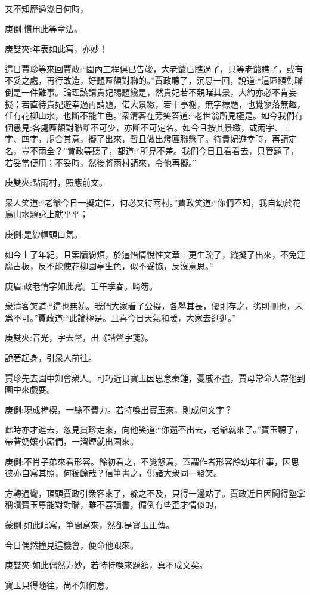 \begin{parag}
    又不知歷過幾日何時，\begin{note}庚側:慣用此等章法。\end{note}\begin{note}庚雙夾:年表如此寫，亦妙！\end{note}這日賈珍等來回賈政:“園內工程俱已告竣，大老爺已瞧過了，只等老爺瞧了，或有不妥之處，再行改造，好題匾額對聯的。”賈政聽了，沉思一回，說道:“這匾額對聯倒是一件難事。論理該請貴妃賜題纔是，然貴妃若不親睹其景，大約亦必不肯妄擬；若直待貴妃遊幸過再請題，偌大景緻，若干亭榭，無字標題，也覺寥落無趣，任有花柳山水，也斷不能生色。”衆清客在旁笑答道:“老世翁所見極是。如今我們有個愚見:各處匾額對聯斷不可少，亦斷不可定名。如今且按其景緻，或兩字、三字、四字，虛合其意，擬了出來，暫且做出燈匾聯懸了。待貴妃遊幸時，再請定名，豈不兩全？”賈政等聽了，都道:“所見不差。我們今日且看看去，只管題了，若妥當便用；不妥時，然後將雨村請來，令他再擬。”\begin{note}庚雙夾:點雨村，照應前文。\end{note}衆人笑道:“老爺今日一擬定佳，何必又待雨村。”賈政笑道:“你們不知，我自幼於花鳥山水題詠上就平平；\begin{note}庚側:是紗帽頭口氣。\end{note}如今上了年紀，且案牘紛煩，於這怡情悅性文章上更生疏了，縱擬了出來，不免迂腐古板，反不能使花柳園亭生色，似不妥協，反沒意思。”\begin{note}庚眉:政老情字如此寫。壬午季春。畸笏。\end{note}衆清客笑道:“這也無妨。我們大家看了公擬，各舉其長，優則存之，劣則刪也，未爲不可。”賈政道:“此論極是。且喜今日天氣和暖，大家去逛逛。”\begin{note}庚雙夾:音光，字去聲，出《諧聲字箋》。\end{note}說著起身，引衆人前往。
\end{parag}


\begin{parag}
    賈珍先去園中知會衆人。可巧近日寶玉因思念秦鍾，憂戚不盡，賈母常命人帶他到園中來戲耍。\begin{note}庚側:現成榫楔，一絲不費力。若特喚出寶玉來，則成何文字？\end{note}此時亦才進去，忽見賈珍走來，向他笑道:“你還不出去，老爺就來了。”寶玉聽了，帶著奶孃小廝們，一溜煙就出園來。\begin{note}庚側:不肖子弟來看形容。餘初看之，不覺怒焉，蓋謂作者形容餘幼年往事，因思彼亦自寫其照，何獨餘哉？信筆書之，供諸大衆同一發笑。\end{note}方轉過彎，頂頭賈政引衆客來了，躲之不及，只得一邊站了。賈政近日因聞得塾掌稱讚寶玉專能對對聯，雖不喜讀書，偏倒有些歪才情似的，\begin{note}蒙側:如此順寫，筆間寫來，然卻是寶玉正傳。\end{note}今日偶然撞見這機會，便命他跟來。\begin{note}庚雙夾:如此偶然方妙，若特特喚來題額，真不成文矣。\end{note}寶玉只得隨往，尚不知何意。
\end{parag}


